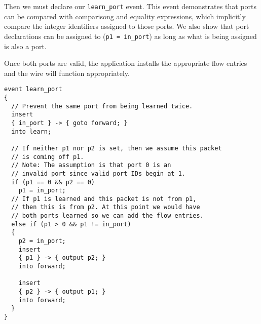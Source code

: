 Then we must declare our \texttt{learn\_port} event. This event demonstrates that ports can be compared with comparisong and equality expressions, which implicitly compare the integer identifiers assigned to those ports. We also show that port declarations can be assigned to (\texttt{p1 = in\_port}) as long as what is being assigned is also a port.

Once both ports are valid, the application installs the appropriate flow entries and the wire will function appropriately.

\noindent\begin{minipage}{\linewidth}
\begin{lstlisting}
event learn_port
{
  // Prevent the same port from being learned twice.
  insert
  { in_port } -> { goto forward; }
  into learn;

  // If neither p1 nor p2 is set, then we assume this packet 
  // is coming off p1.
  // Note: The assumption is that port 0 is an 
  // invalid port since valid port IDs begin at 1.
  if (p1 == 0 && p2 == 0)
    p1 = in_port;
  // If p1 is learned and this packet is not from p1, 
  // then this is from p2. At this point we would have 
  // both ports learned so we can add the flow entries.
  else if (p1 > 0 && p1 != in_port)
  {
    p2 = in_port;
    insert
    { p1 } -> { output p2; }
    into forward;

    insert
    { p2 } -> { output p1; }
    into forward;
  }
}
\end{lstlisting}
\end{minipage}